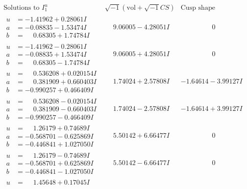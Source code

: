 \documentclass[1p]{elsarticle_modified}
\theoremstyle{definition}
\newcommand{\I}{\sqrt{-1}}
\begin{document}
$$\begin{array}{c|c|c}
\text{Solutions to }I^u_{1}& \I (\text{vol} + \sqrt{-1}CS) & \text{Cusp shape}\\
 \hline 
\begin{aligned}
u &= -1.41962 + 0.28061 I \\
a &= -0.08835 - 1.53474 I \\
b &= \phantom{-}0.68305 + 1.74784 I\end{aligned}
 & \phantom{-}9.06005 - 4.28051 I & \phantom{-0.000000 } 0 \\ \hline\begin{aligned}
u &= -1.41962 - 0.28061 I \\
a &= -0.08835 + 1.53474 I \\
b &= \phantom{-}0.68305 - 1.74784 I\end{aligned}
 & \phantom{-}9.06005 + 4.28051 I & \phantom{-0.000000 } 0 \\ \hline\begin{aligned}
u &= \phantom{-}0.536208 + 0.020154 I \\
a &= \phantom{-}0.381909 + 0.660403 I \\
b &= -0.990257 + 0.466409 I\end{aligned}
 & \phantom{-}1.74024 + 2.57808 I & -1.64614 - 3.99127 I \\ \hline\begin{aligned}
u &= \phantom{-}0.536208 - 0.020154 I \\
a &= \phantom{-}0.381909 - 0.660403 I \\
b &= -0.990257 - 0.466409 I\end{aligned}
 & \phantom{-}1.74024 - 2.57808 I & -1.64614 + 3.99127 I \\ \hline\begin{aligned}
u &= \phantom{-}1.26179 + 0.74689 I \\
a &= -0.568701 - 0.625869 I \\
b &= -0.446841 + 1.027050 I\end{aligned}
 & \phantom{-}5.50142 + 6.66477 I & \phantom{-0.000000 } 0 \\ \hline\begin{aligned}
u &= \phantom{-}1.26179 - 0.74689 I \\
a &= -0.568701 + 0.625869 I \\
b &= -0.446841 - 1.027050 I\end{aligned}
 & \phantom{-}5.50142 - 6.66477 I & \phantom{-0.000000 } 0 \\ \hline\begin{aligned}
u &= \phantom{-}1.45648 + 0.17045 I \\

\end{aligned}
\end{array}$$
\end{document}
